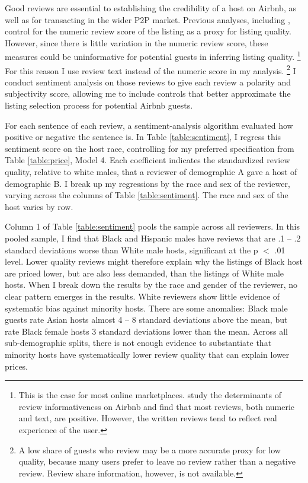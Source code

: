 Good reviews are essential to establishing the credibility of a host on Airbnb, as well as for transacting in the wider P2P market. Previous analyses, including \cite{edelman}, control for the numeric review score of the listing as a proxy for listing quality. However, since there is little variation in the numeric review score, these measures could be uninformative for potential guests in inferring listing quality.%
	\footnote{This is the case for most online marketplaces. \cite{fradkin} study the determinants of review informativeness on Airbnb and find that most reviews, both numeric and text, are positive. However, the written reviews tend to reflect real experience of the user.} 
For this reason I use review text instead of the numeric score in my analysis.%
	\footnote{A low share of guests who review may be a more accurate proxy for low quality, because many users prefer to leave no review rather than a negative review. Review share information, however, is not available.} 
I conduct sentiment analysis on those reviews to give each review a polarity and subjectivity score, allowing me to include controls that better approximate the listing selection process for potential Airbnb guests.

For each sentence of each review, a sentiment-analysis algorithm evaluated how positive or negative the sentence is. In Table \ref{table:sentiment}, I regress this sentiment score on the host race, controlling for my preferred specification from Table \ref{table:price}, Model 4. Each coefficient indicates the standardized review quality, relative to white males, that a reviewer of demographic A gave a host of demographic B. I break up my regressions by the race and sex of the reviewer, varying across the columns of Table \ref{table:sentiment}. The race and sex of the host varies by row. 

Column 1 of Table \ref{table:sentiment} pools the sample across all reviewers. In this pooled sample, I find that Black and Hispanic males have reviews that are .1 -- .2 standard deviations worse than White male hosts, significant at the p $<$ .01 level. Lower quality reviews might therefore explain why the listings of Black host are priced lower, but are also less demanded, than the listings of White male hosts. When I break down the results by the race and gender of the reviewer, no clear pattern emerges in the results. White reviewers show little evidence of systematic bias against minority hosts. There are some anomalies: Black male guests rate Asian hosts almost 4 -- 8 standard deviations above the mean, but rate Black female hosts 3 standard deviations lower than the mean. Across all sub-demographic splits, there is not enough evidence to substantiate that minority hosts have systematically lower review quality that can explain lower prices. 



